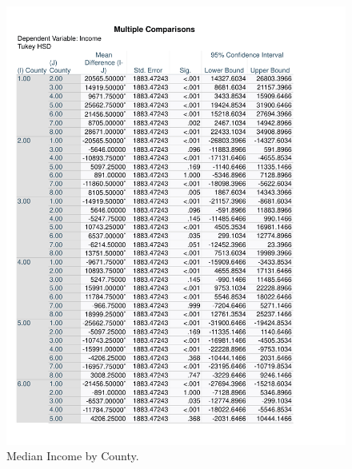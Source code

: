 \documentclass[12pt]{article}
\begin{document}
\begin{figure}[tbp]
  \label{fig:Income by County Graph}
    \centering
    \includegraphics[width=\textwidth]{Income by County Graph.pdf}
    \caption{Median Income by County.}
  \end{figure}
\end{document}
